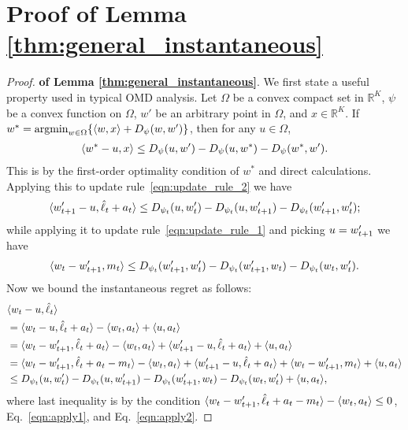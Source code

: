 \appendix

\section{Proof of Lemma \ref{thm:general_instantaneous}}
\begin{proof}{\textbf{of Lemma \ref{thm:general_instantaneous}}.}
We first state a useful property used in typical OMD analysis. Let $\Omega$ be a convex compact set in $\mathbb{R}^K$, $\psi$ be a convex function on $\Omega$, 
$w'$ be an arbitrary point in $\Omega$, and $x \in \mathbb{R}^K$.
If $w^*=\operatorname*{argmin}_{w\in \Omega}\{\langle {w,x} \rangle+D_{\psi}(w,w')\}$, then for any $u \in \Omega$,
\begin{align*}
\langle {w^*-u, x} \rangle\leq D_{\psi}(u,w')-D_\psi(u,w^*)-D_{\psi}(w^*,w'). 
\end{align*}
This is by the first-order optimality condition of $w^*$ and direct calculations. Applying this to update rule~\eqref{eqn:update_rule_2} we have
\begin{align}
\langle {w_{t+1}^\prime-u, \hat{\ell}_t+ a_t} \rangle \leq D_{\psi_t}(u,w_{t}^\prime)-D_{\psi_t}(u,w_{t+1}^\prime)-D_{\psi_t}(w_{t+1}^\prime, w_{t}^\prime); \label{eqn:apply1}
\end{align}
while applying it to update rule~\eqref{eqn:update_rule_1} and picking $u=w_{t+1}^\prime$ we have
\begin{align}
\langle {w_t-w_{t+1}^\prime, m_t} \rangle \leq D_{\psi_t}(w_{t+1}^\prime, w_t^\prime)-D_{\psi_t}(w_{t+1}^\prime, w_t)-D_{\psi_t}(w_t, w_t^\prime).\label{eqn:apply2} 
\end{align}
Now we bound the instantaneous regret as follows:
\begin{align}
&\langle {w_t-u, \hat{\ell}_t} \rangle\nonumber \\
&=\langle {w_t-u, \hat{\ell}_t+ a_t} \rangle-\langle {w_t, a_t} \rangle+\langle {u,  a_t} \rangle\nonumber \\
&=\langle {w_t-w_{t+1}^\prime, \hat{\ell}_t+a_t} \rangle-\langle {w_t, a_t} \rangle+\langle {w_{t+1}^\prime-u, \hat{\ell}_t+a_t} \rangle+\langle {u,   a_t} \rangle\nonumber \\
&=\langle {w_t-w_{t+1}^\prime, \hat{\ell}_t+a_t-m_t} \rangle-\langle {w_t,a_t} \rangle+\langle {w_{t+1}^\prime-u, \hat{\ell}_t+ a_t} \rangle+\langle {w_t-w_{t+1}^\prime, m_t} \rangle+\langle {u,   a_t} \rangle \nonumber \\
&\leq D_{\psi_t}(u,w_{t}^\prime)-D_{\psi_t}(u,w_{t+1}^\prime)-D_{\psi_t}(w_{t+1}^\prime, w_t)-D_{\psi_t}(w_t, w_t^\prime)+\langle {u, a_t} \rangle, \label{eqn:regret_decomposition}
\end{align}
where last inequality is by the condition $\langle {w_t-w_{t+1}^\prime, \hat{\ell}_t+a_t-m_t} \rangle-\langle {w_t,a_t} \rangle\leq 0$, Eq.~\eqref{eqn:apply1}, and Eq.~\eqref{eqn:apply2}.
\end{proof}

